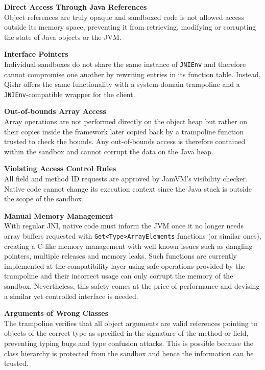 \documentclass[a4paper,12pt,twoside,openright]{report}
\begin{document}
\begin{description}
\item{\bf Direct Access Through Java References} \\
Object references are truly opaque and sandboxed code is not allowed access outside its memory space, preventing it from retrieving, modifying or corrupting the state of Java objects or the JVM.

\item{\bf Interface Pointers} \\
Individual sandboxes do not share the same instance of \texttt{JNIEnv} and therefore cannot compromise one another by rewriting entries in its function table. Instead, Qishr offers the same functionality with a system-domain trampoline and a \texttt{JNIEnv}-compatible wrapper for the client.

\item{\bf Out-of-bounds Array Access} \\
Array operations are not performed directly on the object heap but rather on their copies inside the framework later copied back by a trampoline function trusted to check the bounds. Any out-of-bounds access is therefore contained within the sandbox and cannot corrupt the data on the Java heap.

\item{\bf Violating Access Control Rules} \\
All field and method ID requests are approved by JamVM's visibility checker. Native code cannot change its execution context since the Java stack is outside the scope of the sandbox.

\item{\bf Manual Memory Management} \\
With regular JNI, native code must inform the JVM once it no longer needs array buffers requested with \texttt{Get\-<Type>\-Array\-Elements} functions (or similar ones), creating a C-like memory management with well known issues such as dangling pointers, multiple releases and memory leaks. Such functions are currently implemented at the compatibility layer using safe operations provided by the trampoline and their incorrect usage can only corrupt the memory of the sandbox. Nevertheless, this safety comes at the price of performance and devising a similar yet controlled interface is needed.

\item{\bf Arguments of Wrong Classes} \\
The trampoline verifies that all object arguments are valid references pointing to objects of the correct type as specified in the signature of the method or field, preventing typing bugs and type confusion attacks. This is possible because the class hierarchy is protected from the sandbox and hence the information can be trusted.


\end{description}
\end{document}
